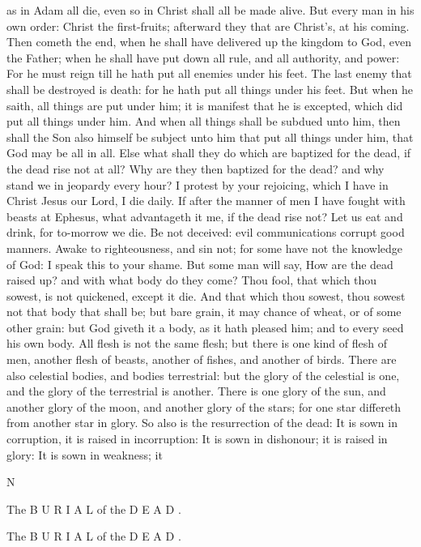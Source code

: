 as in Adam all die, even so in Christ shall all be made alive. But every man in his own order: Christ the first-fruits; afterward they that are Christ’s, at his coming. Then cometh the end, when he shall have delivered up the kingdom to God, even the Father; when he shall have put down all rule, and all authority, and power: For he must reign till he hath put all enemies under his feet. The last enemy that shall be destroyed is death: for he hath put all things under his feet. But when he saith, all things are put under him; it is manifest that he is excepted, which did put all things under him. And when all things shall be subdued unto him, then shall the Son also himself be subject unto him that put all things under him, that God may be all in all. Else what shall they do which are baptized for the dead, if the dead rise not at all? Why are they then baptized for the dead? and why stand we in jeopardy every hour? I protest by your rejoicing, which I have in Christ Jesus our Lord, I die daily. If after the manner of men I have fought with beasts at Ephesus, what advantageth it me, if the dead rise not? Let us eat and drink, for to-morrow we die. Be not deceived: evil communications corrupt good manners. Awake to righteousness, and sin not; for some have not the knowledge of God: I speak this to your shame. But some man will say, How are the dead raised up? and with what body do they come? Thou fool, that which thou sowest, is not quickened, except it die. And that which thou sowest, thou sowest not that body that shall be; but bare grain, it may chance of wheat, or of some other grain: but God giveth it a body, as it hath pleased him; and to every seed his own body. All flesh is not the same flesh; but there is one kind of flesh of men, another flesh of beasts, another of fishes, and another of birds. There are also celestial bodies, and bodies terrestrial: but the glory of the celestial is one, and the glory of the terrestrial is another. There is one glory of the sun, and another glory of the moon, and another glory of the stars; for one star differeth from another star in glory. So also is the resurrection of the dead: It is sown in corruption, it is raised in incorruption: It is sown in dishonour; it is raised in glory: It is sown in weakness; it

N

The B U R I A L of the D E A D .

The B U R I A L of the D E A D .

